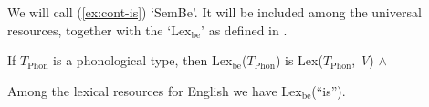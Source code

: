 We will call (\ref{ex:cont-is}) `SemBe'.  It will be included among the
universal resources, together with the `Lex$_{\mathrm{be}}$' as defined in
\nexteg{}.
\begin{ex} 
If $T_{\mathrm{Phon}}$ is a phonological type, then
Lex$_{\mathrm{be}}$($T_{\mathrm{Phon}}$) is Lex($T_{\mathrm{Phon}}$,
\textit{V}) \d{$\wedge$}  
\end{ex} 
Among the lexical resources for English we have Lex$_{\mathrm{be}}$(``is'').
   
